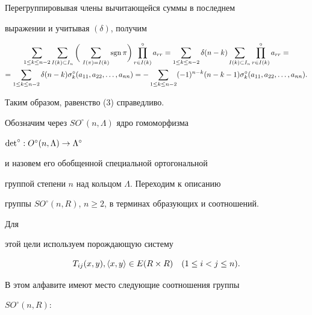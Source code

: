 Перегруппировывая члены вычитающейся суммы в последнем 


выражении и учитывая $(\delta)$, получим 


\begin{multline*} 


\sum_{1\le k\le n-2}\sum_{I(k)\subset I_n} 


\bigg(\,\sum_{I(\pi)=I(k)}\sgn\pi\bigg) 


\prod^\circ_{r\in I(k)}a_{rr}= 


\sum_{1\le k\le n-2}\delta(n-k) 


\sum_{I(k)\subset I_n}\prod^\circ_{r\in I(k)}a_{rr} = \\


% 


=\sum_{1\le k\le n-2}\delta(n-k)\sigma^\circ_k 


(a_{11},a_{22},\dotsc,a_{nn})= 


-\sum_{1\le k\le n-2}(-1)^{n-k} 


(n-k-1)\sigma^\circ_k(a_{11},a_{22},\dotsc, a_{nn}). 


\end{multline*} 


Таким образом, равенство (3) справедливо. 


 


Обозначим через $SO^\circ(n,\Lambda)$ ядро гомоморфизма 


$\operatorname{det}^\circ:O^\circ(n,\Lambda)\to\Lambda^\circ$ 


и назовем его обобщенной специальной ортогональной 


группой степени $n$ над кольцом $\Lambda$. Переходим к описанию 


группы $SO^\circ(n,R)$, $n\ge2$, в терминах образующих и соотношений. 


Для 


этой цели используем порождающую систему 


\begin{equation} 


T_{ij}(x,y),\la x,y\ra\in E(R\times R)\quad 


(1\le i<j\le n). 


\end{equation} 


В этом алфавите имеют место следующие соотношения группы 


$SO^\circ(n,R)$: 


